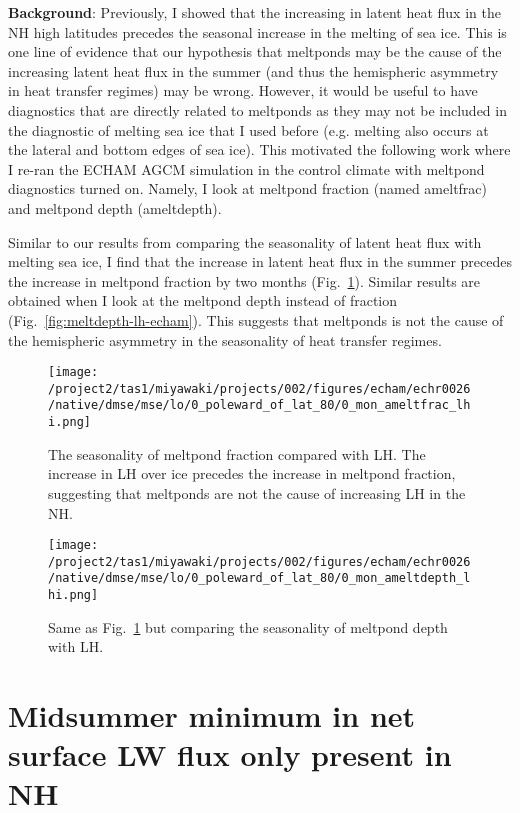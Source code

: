 \documentclass{article}
\begin{document}
\textbf{Background}: Previously, I showed that the increasing in latent heat flux in the NH high latitudes precedes the seasonal increase in the melting of sea ice. This is one line of evidence that our hypothesis that meltponds may be the cause of the increasing latent heat flux in the summer (and thus the hemispheric asymmetry in heat transfer regimes) may be wrong. However, it would be useful to have diagnostics that are directly related to meltponds as they may not be included in the diagnostic of melting sea ice that I used before (e.g. melting also occurs at the lateral and bottom edges of sea ice). This motivated the following work where I re-ran the ECHAM AGCM simulation in the control climate with meltpond diagnostics turned on. Namely, I look at meltpond fraction (named ameltfrac) and meltpond depth (ameltdepth).

Similar to our results from comparing the seasonality of latent heat flux with melting sea ice, I find that the increase in latent heat flux in the summer precedes the increase in meltpond fraction by two months (Fig.~\ref{fig:meltfrac-lh-echam}). Similar results are obtained when I look at the meltpond depth instead of fraction (Fig.~\ref{fig:meltdepth-lh-echam}). This suggests that meltponds is not the cause of the hemispheric asymmetry in the seasonality of heat transfer regimes.

\begin{figure}
    \texttt{[image: /project2/tas1/miyawaki/projects/002/figures/echam/echr0026/native/dmse/mse/lo/0\_poleward\_of\_lat\_80/0\_mon\_ameltfrac\_lhi.png]}
    \caption{The seasonality of meltpond fraction compared with LH. The increase in LH over ice precedes the increase in meltpond fraction, suggesting that meltponds are not the cause of increasing LH in the NH.}
    \label{fig:meltfrac-lh-echam}
\end{figure}

\begin{figure}
    \texttt{[image: /project2/tas1/miyawaki/projects/002/figures/echam/echr0026/native/dmse/mse/lo/0\_poleward\_of\_lat\_80/0\_mon\_ameltdepth\_lhi.png]}
    \caption{Same as Fig.~\ref{fig:meltfrac-lh-echam} but comparing the seasonality of meltpond depth with LH.}
    \label{fig:meltdepth-lhi-echam}
\end{figure}

\section{Midsummer minimum in net surface LW flux only present in NH}
\end{document}
